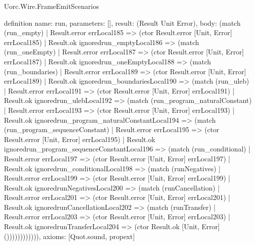 \begin{lexlean}{Uorc.Wire.FrameEmitScenarios}
\begin{semanticmodule}
definition{
  name: run,
  parameters: [],
  result: (Result Unit Error),
  body: (match (run_empty)
    | Result.error errLocal185 => (ctor Result.error [Unit, Error] errLocal185)
    | Result.ok ignoredrun_emptyLocal186 => (match (run_oneEmpty)
      | Result.error errLocal187 => (ctor Result.error [Unit, Error] errLocal187)
      | Result.ok ignoredrun_oneEmptyLocal188 => (match (run_boundaries)
        | Result.error errLocal189 => (ctor Result.error [Unit, Error] errLocal189)
        | Result.ok ignoredrun_boundariesLocal190 => (match (run_uleb)
          | Result.error errLocal191 => (ctor Result.error [Unit, Error] errLocal191)
          | Result.ok ignoredrun_ulebLocal192 => (match (run_program_naturalConstant)
            | Result.error errLocal193 => (ctor Result.error [Unit, Error] errLocal193)
            | Result.ok ignoredrun_program_naturalConstantLocal194 => (match (run_program_sequenceConstant)
              | Result.error errLocal195 => (ctor Result.error [Unit, Error] errLocal195)
              | Result.ok ignoredrun_program_sequenceConstantLocal196 => (match (run_conditional)
                | Result.error errLocal197 => (ctor Result.error [Unit, Error] errLocal197)
                | Result.ok ignoredrun_conditionalLocal198 => (match (runNegatives)
                  | Result.error errLocal199 => (ctor Result.error [Unit, Error] errLocal199)
                  | Result.ok ignoredrunNegativesLocal200 => (match (runCancellation)
                    | Result.error errLocal201 => (ctor Result.error [Unit, Error] errLocal201)
                    | Result.ok ignoredrunCancellationLocal202 => (match (runTransfer)
                      | Result.error errLocal203 => (ctor Result.error [Unit, Error] errLocal203)
                      | Result.ok ignoredrunTransferLocal204 => (ctor Result.ok [Unit, Error] ()))))))))))),
  axioms: [Quot.sound, propext]
}
\end{semanticmodule}
\end{lexlean}

